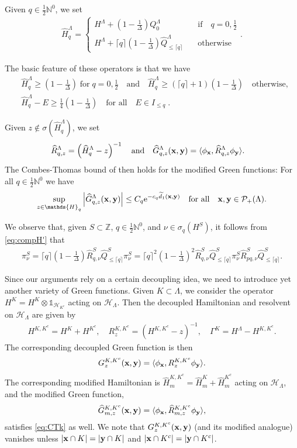\documentclass[12pt, a4paper,reqno]{amsart}
\numberwithin{equation}{section}
\newcommand\N{\mathbb N}
\newcommand\Z{\mathbb Z}
\newcommand\x{\mathbf{x}}
\newcommand\y{\mathbf{y}}
\newcommand\e{\mathrm{e}}
\newcommand\cH{\mathcal{H}}
\newcommand\cP{\mathcal{P}}
\newcommand\what{\widehat}
\newcommand\wtilde{\widetilde}
\newcommand\be{\begin{equation}\begin{aligned}}
\newcommand\ee{\end{aligned}\end{equation}}
\newcommand{\abs}[1]{\left\lvert #1 \right\rvert}
\newcommand{\pa}[1]{\left( #1 \right)}
\newcommand{\cl}[1]{\lceil #1 \rceil}
\newcommand\La{\Lambda}
\newcommand{\qtx}[1]{\quad\text{#1}\quad}
\newcommand{\sqtx}[1]{\;\text{#1}\;}
\newcommand{\tfd}{\pa{1- \tfrac{1}{\Delta}}}
\begin{document}
 Given  $q\in\frac12\N^0$, we set
\be \label{eq:compH'}
\what  H_q^{ \Lambda}=\begin{cases}H^{\Lambda}+\tfd Q_0^\Lambda & \qtx{if} q=0,\tfrac12\\
H^{\Lambda}+{\cl{q}}\tfd \what  Q_{\le \cl{q}}^{\Lambda} & \quad \text{otherwise} \end{cases} .
\ee 

 The basic feature of these operators is that    we have
\be \label{eq:hatH1'}
& \what  H_q^{ \Lambda} \ge \tfd\sqtx{for}   q=0,\tfrac12 \qtx{and}  \what  H_q^{ \Lambda}\ge  \pa{{\cl{q}}+1} \tfd  \quad \text{otherwise}, \\
&\what  H_q^{ \Lambda}-E  \ge \tfrac 1{4}\tfd \qtx{for all}    E \in I_{\le {q}} \; .
\ee   

Given  $ z\notin \sigma(\what  H_q^\La) $, we set 
\be\label{eq:Greenk}
\what  R^{\Lambda}_{q,z}&= \pa{\what  H_q^\La  -z}^{-1} \qtx{and}\what G^\La_{q,z}({\bf x},{\bf y}) = \langle \phi_{\bf x},\what R_{q,z}^\Lambda \phi_{\bf y}\rangle.
\ee 
The Combes-Thomas bound of \cite[Proposition 4.1]{EKS1} then holds for the modified Green functions:
For all $q \in \frac 12 \N^0$ we have
 \be\label{eq:CTk}
 \sup_{z\in \mathds{H}_q} \abs{\what G^\La_{q,z}({\bf x},{\bf y})}\le C_q \e^{-c_q \wtilde d_1(\x,\y)} 
 \qtx{for all}  {\x,\y \in \cP_+(\La).}
\ee

 We observe that, given $S\subset \Z$,   $q\in\frac12\N^0$, and $\nu \in \sigma_q(H^S)$, it follows from \eqref{eq:compH'} that
\be\label{eigest}
\pi^S_\nu=\lceil q \rceil\tfd \what  R^{S}_{q,\nu}\what Q^S_{\le \lceil q \rceil} \pi^S_\nu=
\lceil q \rceil^2\tfd^2 \what  R^{S}_{q,\nu}\what Q^S_{\le \lceil q \rceil} \pi^S_\nu  \what  R^{S}_{pq,\nu}\what Q^S_{\le \lceil q \rceil}.
\ee

Since our arguments rely on a certain decoupling idea, we need to introduce yet another variety of Green functions. Given  $K\subset \La$, we    consider the operator  $H^K= H^K\otimes \mathds{1}_{\cH_{K^c}}$ acting on $\cH_\La$. Then the decoupled Hamiltonian and resolvent on $\cH_\La$ are given by
\be\label{eq:Gamma}
H^{K,K^c}= H^{K}+H^{K^c}, \quad  R_z^{K,K^c}=\pa{H^{K,K^c}-z}^{-1}, \quad \Gamma^K=H^\La-H^{K,K^c}.
 \ee
The corresponding decoupled Green function is then 
\be\label{eq:Greend}
G^{K,K^c}_{z}({\bf x},{\bf y}) = \langle \phi_{\bf x},R_{z}^{K,K^c} \phi_{\bf y}\rangle.
\ee
The corresponding modified Hamiltonian is $\what H^{K,K^c}_m= \what H^{K}_m+\what H^{K^c}_m$ acting on $\cH_\La$, and the modified Green function, 
\be\label{eq:Greenkd}
\what G^{K,K^c}_{m,z}({\bf x},{\bf y}) = \langle \phi_{\bf x},\what R_{m,z}^{K,K^c} \phi_{\bf y}\rangle,
\ee
satisfies \eqref{eq:CTk} as well. We note that $G^{K,K^c}_{z}({\bf x},{\bf y})$ (and its modified analogue) vanishes unless $\abs{{\bf x}\cap K}=\abs{{\bf y}\cap K}$ and $\abs{{\bf x}\cap K^c}=\abs{{\bf y}\cap K^c}$.
\end{document}
